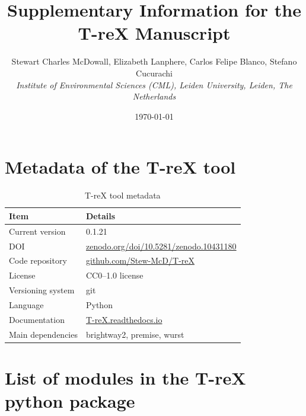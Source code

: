 \documentclass{article}
\begin{document}
\title{\textbf{Supplementary Information for the T-reX Manuscript}}
\author{Stewart Charles McDowall, Elizabeth Lanphere, Carlos Felipe Blanco, Stefano Cucurachi \\
\textit{Institute of Environmental Sciences (CML), Leiden University, Leiden, The Netherlands}}
\date{\today}

\maketitle
\tableofcontents
\listoffigures
\listoftables
\clearpage

\section{Metadata of the T-reX tool}

\begin{table}[h]
    \caption{T-reX tool metadata}\label{tab:metadata}
    \centering
    \begin{tabular}{ll}
    \toprule
    \textbf{Item} & \textbf{Details} \\
    \midrule
    Current version & 0.1.21 \\
    DOI & \url{zenodo.org/doi/10.5281/zenodo.10431180} \\
    Code repository & \url{github.com/Stew-McD/T-reX} \\
    License & CC0--1.0 license \\
    Versioning system & git \\
    Language & Python \\
    Documentation & \url{T-reX.readthedocs.io} \\
    Main dependencies & brightway2, premise, wurst \\
    \bottomrule
    \end{tabular}
\end{table}

\section{List of modules in the T-reX python package}
\end{document}
